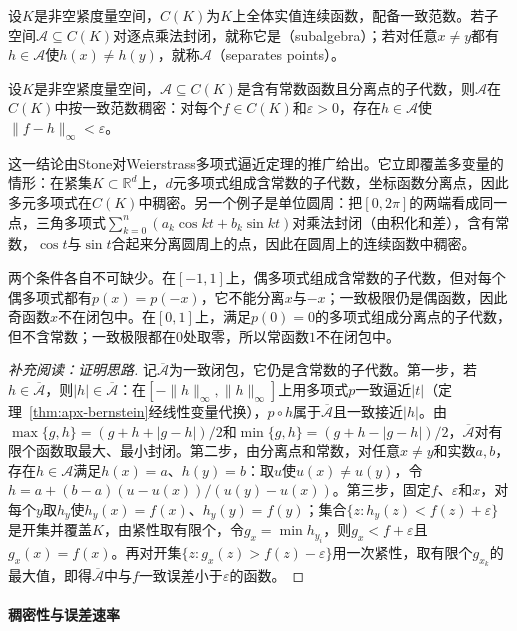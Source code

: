 设$K$是非空紧度量空间，$C(K)$为$K$上全体实值连续函数，配备一致范数。若子空间$\mathcal A\subseteq C(K)$对逐点乘法封闭，就称它是（subalgebra）；若对任意$x\ne y$都有$h\in\mathcal A$使$h(x)\ne h(y)$，就称$\mathcal A$（separates points）。

\begin{theorem}
\label{thm:apx-stone-weierstrass}
设$K$是非空紧度量空间，$\mathcal A\subseteq C(K)$是含有常数函数且分离点的子代数，则$\mathcal A$在$C(K)$中按一致范数稠密：对每个$f\in C(K)$和$\varepsilon>0$，存在$h\in\mathcal A$使$\|f-h\|_\infty<\varepsilon$。
\end{theorem}

这一结论由Stone对Weierstrass多项式逼近定理的推广给出。它立即覆盖多变量的情形：在紧集$K\subset\mathbb R^d$上，$d$元多项式组成含常数的子代数，坐标函数分离点，因此多元多项式在$C(K)$中稠密。另一个例子是单位圆周：把$[0,2\pi]$的两端看成同一点，三角多项式$\sum_{k=0}^n(a_k\cos kt+b_k\sin kt)$对乘法封闭（由积化和差），含有常数，$\cos t$与$\sin t$合起来分离圆周上的点，因此在圆周上的连续函数中稠密。

两个条件各自不可缺少。在$[-1,1]$上，偶多项式组成含常数的子代数，但对每个偶多项式都有$p(x)=p(-x)$，它不能分离$x$与$-x$；一致极限仍是偶函数，因此奇函数$x$不在闭包中。在$[0,1]$上，满足$p(0)=0$的多项式组成分离点的子代数，但不含常数；一致极限都在$0$处取零，所以常函数$1$不在闭包中。

\begin{proof}[补充阅读：证明思路]
记$\overline{\mathcal A}$为一致闭包，它仍是含常数的子代数。第一步，若$h\in\overline{\mathcal A}$，则$|h|\in\overline{\mathcal A}$：在$[-\|h\|_\infty,\|h\|_\infty]$上用多项式$p$一致逼近$|t|$（定理~\ref{thm:apx-bernstein}经线性变量代换），$p\circ h$属于$\overline{\mathcal A}$且一致接近$|h|$。由$\max\{g,h\}=(g+h+|g-h|)/2$和$\min\{g,h\}=(g+h-|g-h|)/2$，$\overline{\mathcal A}$对有限个函数取最大、最小封闭。第二步，由分离点和常数，对任意$x\ne y$和实数$a,b$，存在$h\in\mathcal A$满足$h(x)=a$、$h(y)=b$：取$u$使$u(x)\ne u(y)$，令$h=a+(b-a)(u-u(x))/(u(y)-u(x))$。第三步，固定$f$、$\varepsilon$和$x$，对每个$y$取$h_y$使$h_y(x)=f(x)$、$h_y(y)=f(y)$；集合$\{z:h_y(z)<f(z)+\varepsilon\}$是开集并覆盖$K$，由紧性取有限个，令$g_x=\min h_{y_i}$，则$g_x<f+\varepsilon$且$g_x(x)=f(x)$。再对开集$\{z:g_x(z)>f(z)-\varepsilon\}$用一次紧性，取有限个$g_{x_k}$的最大值，即得$\overline{\mathcal A}$中与$f$一致误差小于$\varepsilon$的函数。
\end{proof}

\paragraph{稠密性与误差速率}

